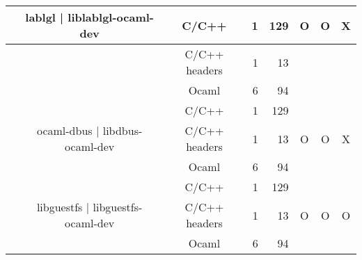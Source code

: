 \documentclass[11pt,a4paper]{article}
\begin{document}
\begin{table}[h,t]
\begin{tabular}{|>{\centering}m{3cm}| c|c|r|r| c| c|c|}
 &\multirow{3}{3cm}{lablgl | liblablgl-ocaml-dev} & C/C++ & 1 & 129 & \multirow{3}{*}{O} & \multirow{3}{*}{O} & \multirow{3}{*}{X}\\
\cline{3-5}
& &                           C/C++ headers & 1 & 13 & & & \\
\cline{3-5}
& &                          Ocaml & 6 & 94 & & & \\
\cline{2-8}
 &\multirow{3}{3cm}{ocaml-dbus | libdbus-ocaml-dev} & C/C++ & 1 & 129 & \multirow{3}{*}{O} & \multirow{3}{*}{O} & \multirow{3}{*}{X}\\
\cline{3-5}
& &                           C/C++ headers & 1 & 13 & & & \\
\cline{3-5}
& &                          Ocaml & 6 & 94 & & & \\
\cline{2-8}



 &\multirow{3}{3cm}{libguestfs | libguestfs-ocaml-dev} & C/C++ & 1 & 129 & \multirow{3}{*}{O} & \multirow{3}{*}{O} & \multirow{3}{*}{O}\\
\cline{3-5}
& &                           C/C++ headers & 1 & 13 & & & \\
\cline{3-5}
& &                          Ocaml & 6 & 94 & & & \\
\hline




\end{tabular}
\end{table}

\end{document}
